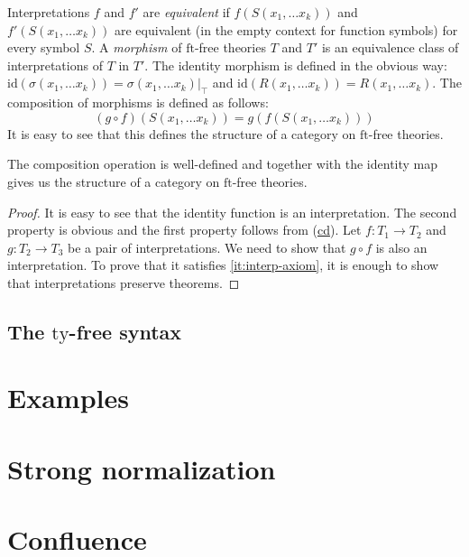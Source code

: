 \documentclass[reqno]{amsart}
\newcommand{\axref}[1]{(\hyperref[ax:#1]{#1})}
\theoremstyle{definition}
\theoremstyle{remark}
\newcommand{\fs}[1]{\mathrm{#1}}
\newcommand{\ft}{\fs{ft}}
\newcommand{\ty}{\fs{ty}}
\newcommand{\id}{\fs{id}}
\numberwithin{figure}{section}
\begin{document}
Interpretations $f$ and $f'$ are \emph{equivalent} if $f(S(x_1, \ldots x_k))$ and $f'(S(x_1, \ldots x_k))$ are equivalent (in the empty context for function symbols) for every symbol $S$.
A \emph{morphism} of $\ft$-free theories $T$ and $T'$ is an equivalence class of interpretations of $T$ in $T'$.
The identity morphism is defined in the obvious way: $\id(\sigma(x_1, \ldots x_k)) = \sigma(x_1, \ldots x_k)|_\top$ and $\id(R(x_1, \ldots x_k)) = R(x_1, \ldots x_k)$.
The composition of morphisms is defined as follows:
\[ (g \circ f)(S(x_1, \ldots x_k)) = g(f(S(x_1, \ldots x_k))) \]
It is easy to see that this defines the structure of a category on $\ft$-free theories.

\begin{prop}
The composition operation is well-defined and together with the identity map gives us the structure of a category on $\ft$-free theories.
\end{prop}
\begin{proof}
It is easy to see that the identity function is an interpretation.
The second property is obvious and the first property follows from \axref{cd}.
Let $f : T_1 \to T_2$ and $g : T_2 \to T_3$ be a pair of interpretations.
We need to show that $g \circ f$ is also an interpretation.
To prove that it satisfies \eqref{it:interp-axiom}, it is enough to show that interpretations preserve theorems.
\end{proof}

\subsection{The $\ty$-free syntax}
\label{sec:types}

\section{Examples}

\section{Strong normalization}

\section{Confluence}



\end{document}
